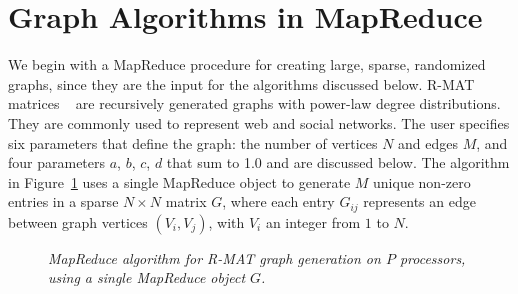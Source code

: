 \section{Graph Algorithms in MapReduce}
\label{sec:graph}

We begin with a MapReduce procedure for creating large, sparse,
randomized graphs, since they are the input for the algorithms
discussed below.  R-MAT matrices ~\cite{RMAT} are recursively
generated graphs with power-law degree distributions.  They are
commonly used to represent web and social networks.  The user
specifies six parameters that define the graph: the number of
vertices $N$ and edges $M$, and four parameters $a$, $b$, $c$, $d$
that sum to 1.0 and are discussed below.  The algorithm in
Figure~\ref{fig:rmat} uses a single MapReduce object to generate $M$
unique non-zero entries in a sparse $N \times N$ matrix $G$, where
each entry $G_{ij}$ represents an edge between graph vertices
$(V_i,V_j)$, with $V_i$ an integer from $1$ to $N$.

\begin{figure}[htb]
 \begin{center}\end{center}


 \caption{\it MapReduce algorithm for R-MAT graph generation on $P$
 processors, using a single MapReduce object $G$.}

 \label{fig:rmat}
\end{figure}


